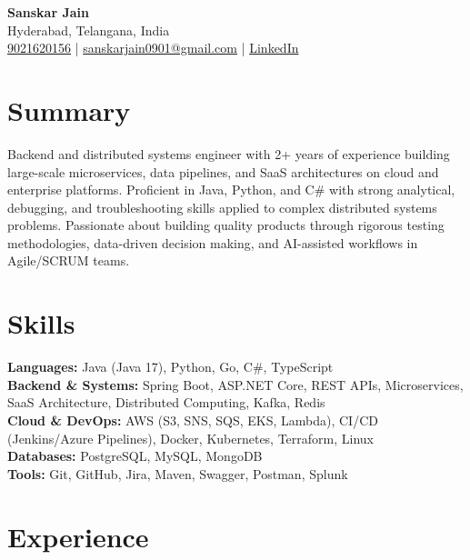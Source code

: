 \documentclass[a4paper,10pt]{article}
\begin{document}
\begin{center}
    {\LARGE \textbf{Sanskar Jain}} \\
    Hyderabad, Telangana, India \\
    \href{tel:9021620156}{9021620156} \;|\;
    \href{mailto:sanskarjain0901@gmail.com}{sanskarjain0901@gmail.com} \;|\;
    \href{https://www.linkedin.com/in/sanskar-jain0901/}{LinkedIn}
\end{center}

\vspace{3pt}

\section*{Summary}
Backend and distributed systems engineer with 2+ years of experience building large-scale microservices, data pipelines, and SaaS architectures on cloud and enterprise platforms.
Proficient in Java, Python, and C\# with strong analytical, debugging, and troubleshooting skills applied to complex distributed systems problems.
Passionate about building quality products through rigorous testing methodologies, data-driven decision making, and AI-assisted workflows in Agile/SCRUM teams.

\section*{Skills}
\textbf{Languages:} Java (Java 17), Python, Go, C\#, TypeScript \\
\textbf{Backend \& Systems:} Spring Boot, ASP.NET Core, REST APIs, Microservices, SaaS Architecture, Distributed Computing, Kafka, Redis \\
\textbf{Cloud \& DevOps:} AWS (S3, SNS, SQS, EKS, Lambda), CI/CD (Jenkins/Azure Pipelines), Docker, Kubernetes, Terraform, Linux \\
\textbf{Databases:} PostgreSQL, MySQL, MongoDB \\
\textbf{Tools:} Git, GitHub, Jira, Maven, Swagger, Postman, Splunk

\section*{Experience}
\end{document}
